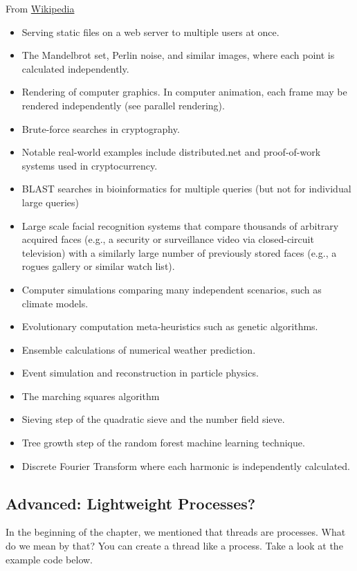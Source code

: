 From \href{https://en.wikipedia.org/wiki/Embarrassingly_parallel}{Wikipedia}
\begin{itemize}
\tightlist
\item Serving static files on a web server to multiple users at once.
\item The Mandelbrot set, Perlin noise, and similar images, where each point is calculated independently.
\item Rendering of computer graphics. In computer animation, each frame may be rendered independently (see parallel rendering).
\item Brute-force searches in cryptography.
\item Notable real-world examples include distributed.net and proof-of-work systems used in cryptocurrency.
\item BLAST searches in bioinformatics for multiple queries (but not for individual large queries)
\item Large scale facial recognition systems that compare thousands of arbitrary acquired faces (e.g., a security or surveillance video via closed-circuit television) with a similarly large number of previously stored faces (e.g., a rogues gallery or similar watch list).
\item Computer simulations comparing many independent scenarios, such as climate models.
\item Evolutionary computation meta-heuristics such as genetic algorithms.
\item Ensemble calculations of numerical weather prediction.
\item Event simulation and reconstruction in particle physics.
\item The marching squares algorithm
\item Sieving step of the quadratic sieve and the number field sieve.
\item Tree growth step of the random forest machine learning technique.
\item Discrete Fourier Transform where each harmonic is independently calculated.
\end{itemize}

\subsection{Advanced: Lightweight Processes?}

In the beginning of the chapter, we mentioned that threads are processes.
What do we mean by that?
You can create a thread like a process.
Take a look at the example code below.

